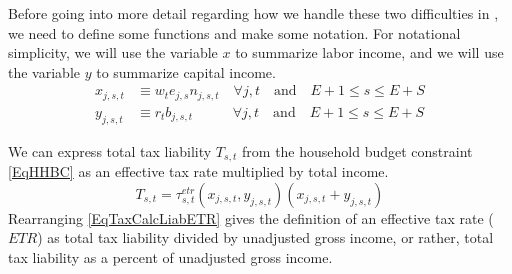  Before going into more detail regarding how we handle these two difficulties in \ogindia, we need to define some functions and make some notation. For notational simplicity, we will use the variable $x$ to summarize labor income, and we will use the variable $y$ to summarize capital income.
  \begin{align}
    x_{j,s,t} &\equiv w_{t}e_{j,s}n_{j,s,t} \quad\forall j, t \quad\text{and}\quad E+1\leq s\leq E+S \label{EqTaxCalcLabInc} \\
    y_{j,s,t} &\equiv r_{t}b_{j,s,t} \qquad\:\:\:\,\forall j, t \quad\text{and}\quad E+1\leq s\leq E+S \label{EqTaxCalcLabInc}
  \end{align}

  We can express total tax liability $T_{s,t}$ from the household budget constraint \eqref{EqHHBC} as an effective tax rate multiplied by total income.
  \begin{equation}\label{EqTaxCalcLiabETR}
    T_{s,t} = \tau^{etr}_{s,t}(x_{j,s,t}, y_{j,s,t})\left(x_{j,s,t} + y_{j,s,t}\right)
  \end{equation}
  Rearranging \eqref{EqTaxCalcLiabETR} gives the definition of an effective tax rate ($ETR$) as total tax liability divided by unadjusted gross income, or rather, total tax liability as a percent of unadjusted gross income.

